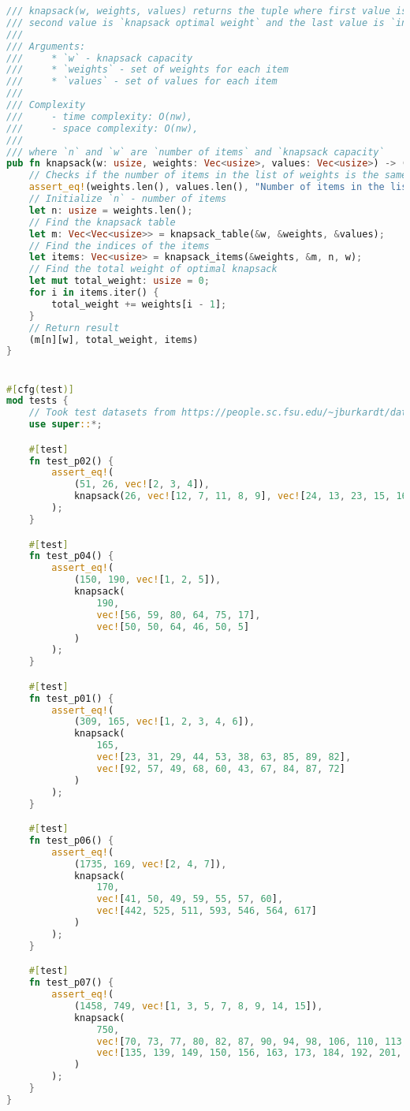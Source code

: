 \begin{lstlisting}[language=Rust]
/// knapsack(w, weights, values) returns the tuple where first value is `optimal profit`,
/// second value is `knapsack optimal weight` and the last value is `indices of items`, that we got (from 1 to `n`)
///
/// Arguments:
///     * `w` - knapsack capacity
///     * `weights` - set of weights for each item
///     * `values` - set of values for each item
///
/// Complexity
///     - time complexity: O(nw),
///     - space complexity: O(nw),
///
/// where `n` and `w` are `number of items` and `knapsack capacity`
pub fn knapsack(w: usize, weights: Vec<usize>, values: Vec<usize>) -> (usize, usize, Vec<usize>) {
    // Checks if the number of items in the list of weights is the same as the number of items in the list of values
    assert_eq!(weights.len(), values.len(), "Number of items in the list of weights doesn't match the number of items in the list of values!");
    // Initialize `n` - number of items
    let n: usize = weights.len();
    // Find the knapsack table
    let m: Vec<Vec<usize>> = knapsack_table(&w, &weights, &values);
    // Find the indices of the items
    let items: Vec<usize> = knapsack_items(&weights, &m, n, w);
    // Find the total weight of optimal knapsack
    let mut total_weight: usize = 0;
    for i in items.iter() {
        total_weight += weights[i - 1];
    }
    // Return result
    (m[n][w], total_weight, items)
}


#[cfg(test)]
mod tests {
    // Took test datasets from https://people.sc.fsu.edu/~jburkardt/datasets/bin_packing/bin_packing.html
    use super::*;

    #[test]
    fn test_p02() {
        assert_eq!(
            (51, 26, vec![2, 3, 4]),
            knapsack(26, vec![12, 7, 11, 8, 9], vec![24, 13, 23, 15, 16])
        );
    }

    #[test]
    fn test_p04() {
        assert_eq!(
            (150, 190, vec![1, 2, 5]),
            knapsack(
                190,
                vec![56, 59, 80, 64, 75, 17],
                vec![50, 50, 64, 46, 50, 5]
            )
        );
    }

    #[test]
    fn test_p01() {
        assert_eq!(
            (309, 165, vec![1, 2, 3, 4, 6]),
            knapsack(
                165,
                vec![23, 31, 29, 44, 53, 38, 63, 85, 89, 82],
                vec![92, 57, 49, 68, 60, 43, 67, 84, 87, 72]
            )
        );
    }

    #[test]
    fn test_p06() {
        assert_eq!(
            (1735, 169, vec![2, 4, 7]),
            knapsack(
                170,
                vec![41, 50, 49, 59, 55, 57, 60],
                vec![442, 525, 511, 593, 546, 564, 617]
            )
        );
    }

    #[test]
    fn test_p07() {
        assert_eq!(
            (1458, 749, vec![1, 3, 5, 7, 8, 9, 14, 15]),
            knapsack(
                750,
                vec![70, 73, 77, 80, 82, 87, 90, 94, 98, 106, 110, 113, 115, 118, 120],
                vec![135, 139, 149, 150, 156, 163, 173, 184, 192, 201, 210, 214, 221, 229, 240]
            )
        );
    }
}
\end{lstlisting}
